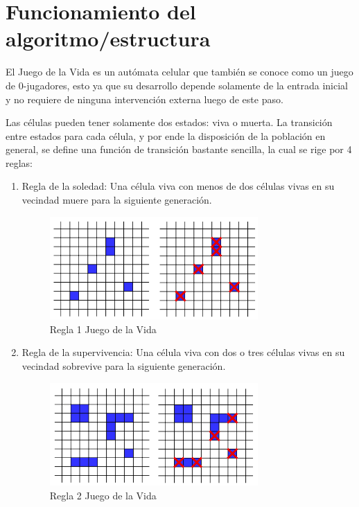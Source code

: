 \documentclass[12pt,letterpaper]{article}
\begin{document}
\newpage 
\section{Funcionamiento del algoritmo/estructura}
El Juego de la Vida es un autómata celular que también se conoce como un juego de 0-jugadores, esto ya que su desarrollo depende solamente de la entrada inicial y no requiere de ninguna intervención externa luego de este paso.

Las células  pueden tener solamente dos estados: viva o muerta. La transición entre estados para cada célula, y por ende la disposición de la población en general, se define una función de transición bastante sencilla, la cual se rige por 4 reglas:
\begin{enumerate}
\item Regla de la soledad: Una célula viva con menos de dos células vivas en su vecindad muere para la siguiente generación.

\begin{figure}[H]
\centering
\includegraphics[width=0.75\textwidth]{img/Regla1.png}
\caption{\label{fig:Regla1}Regla 1 Juego de la Vida \cite{Suarez}}
\end{figure}

\item Regla de la supervivencia: Una célula viva con dos o tres células vivas en su vecindad sobrevive para la siguiente generación.

\begin{figure}[H]
\centering
\includegraphics[width=0.75\textwidth]{img/Regla2.png}
\caption{\label{fig:Regla2}Regla 2 Juego de la Vida \cite{Suarez}}
\end{figure}


\end{enumerate}
\end{document}
